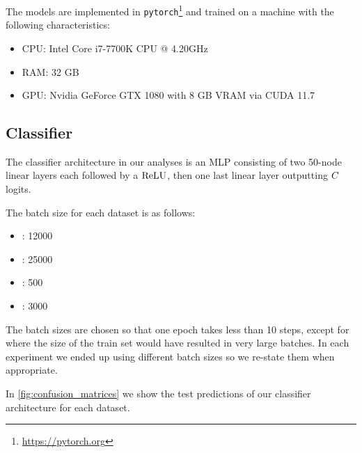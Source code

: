\documentclass[../main.tex]{subfiles}
\begin{document}
The models are implemented in \texttt{pytorch}\footnote{\url{https://pytorch.org}} and trained on a machine with the following characteristics:
\begin{itemize}
    \item CPU: Intel Core i7-7700K CPU @ 4.20GHz
    \item RAM: 32 GB
    \item GPU: Nvidia GeForce GTX 1080 with 8 GB VRAM via CUDA 11.7
\end{itemize}

\subsection{Classifier}
\label{exp/classifiers}

The classifier architecture in our analyses is an MLP consisting of two 50-node linear layers each followed by a $\text{ReLU}$, then one last linear layer outputting $C$ logits.

The batch size for each dataset is as follows:
\begin{itemize}
    \item \CakeOnSea: 12000
    \item \ForestCover: 25000
    \item \WineQuality: 500
    \item \OnlineNewsPopularity: 3000
\end{itemize}
The batch sizes are chosen so that one epoch takes less than 10 steps, except for \ForestCover{} where the size of the train set would have resulted in very large batches.
In each experiment we ended up using different batch sizes so we re-state them when appropriate.

In \autoref{fig:confusion_matrices} we show the test predictions of our classifier architecture for each dataset.
\end{document}
